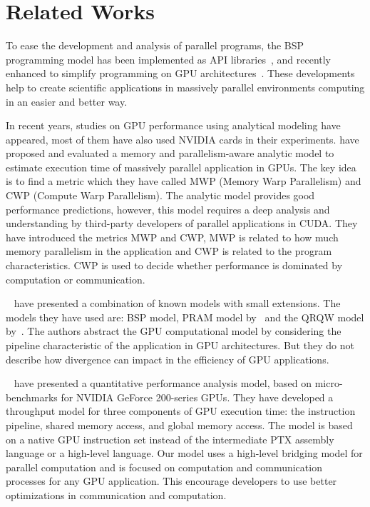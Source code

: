 \section{Related Works}\label{sec:relatedModel}
To ease the development and analysis of parallel programs, the BSP programming model has been implemented as API libraries~\citep{BSPLib}, and recently enhanced to simplify programming on GPU architectures~\citep{bsgp}. These developments help to create scientific applications in massively parallel environments computing in an easier and better way.

In  recent  years,  studies on GPU performance using analytical modeling have appeared, most of them have also used NVIDIA cards in their experiments. \cite{GpuModelHong:2009} have proposed and evaluated a memory and parallelism-aware analytic model to estimate execution time of massively parallel application in GPUs. The key idea is to find a metric which they have called MWP (Memory Warp Parallelism) and CWP (Compute Warp Parallelism). The analytic model provides good performance predictions, however, this model requires a deep analysis and understanding by third-party developers of parallel applications in CUDA. They have introduced the metrics MWP and CWP, MWP is related to how much memory parallelism in the application and CWP is related to the program characteristics. CWP is used to decide whether performance is dominated by computation or communication. 

~\cite{PredicModelGPU2009} have presented a combination of known models with small extensions. The models they have used are: BSP model, PRAM model by~\citep{Fortune:1978:PRAM} and the QRQW model by~\cite{Gibbons1983:QRQW}. The authors abstract the GPU computational model by considering the pipeline characteristic of the application in GPU architectures. But they do not describe how divergence can impact in the efficiency of GPU applications. 

~\cite{Zhang:2011:GPUmodel} have presented a quantitative performance analysis model, based on micro-benchmarks for NVIDIA GeForce 200-series GPUs. They have developed a throughput model for three components of GPU execution time: the instruction pipeline, shared memory access, and global memory access. The model is based on a native GPU instruction set instead of the intermediate PTX assembly language or a high-level language. Our model uses a high-level bridging model for parallel computation and is focused on computation and communication processes for any GPU application. This encourage developers to use better optimizations in communication and computation.

